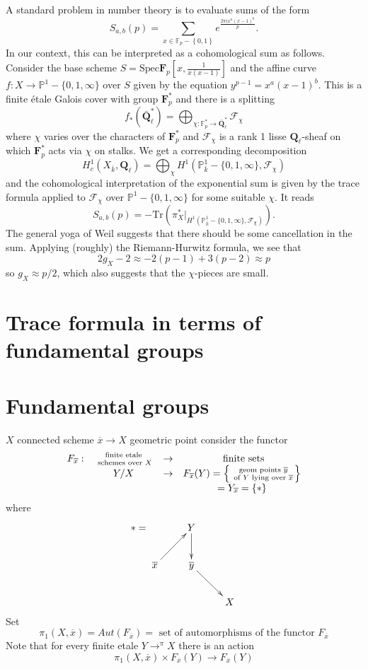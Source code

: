 A standard problem in number theory is to evaluate sums of the form
$$
S_{a,b}(p) = \sum_{x\in \mathbb F_p-\left\{0, 1\right\}} e^{\frac{2\pi 
ix^a(x-1)^b}{p}}.
$$
In our context, this can be interpreted as a cohomological sum as follows. 
Consider the base scheme $S = \text{Spec} \mathbf{F}_p\left[x, 
\frac{1}{x(x-1)}\right]$ and the affine curve $f: X \to \mathbb P^1-\{0, 1, 
\infty\}$ over $S$ given by the equation $y^{p-1} = x^a(x-1)^b$. This is a 
finite \'etale Galois cover with group $\mathbf{F}_p^*$ and there is a splitting
$$
f_*(\bar{\mathbf{Q}}_\ell^*) =
\bigoplus_{\chi : \mathbb F_p^*\to \bar{\mathbf{Q}}_\ell^*} \mathcal{F}_\chi
$$
where $\chi$ varies over the characters of $\mathbf{F}_p^*$ and 
$\mathcal{F}_\chi$ is a rank 1 lisse $\mathbf{Q}_\ell$-sheaf on which 
$\mathbf{F}_p^*$ acts via $\chi$ on stalks. We get a corresponding decomposition
$$
H_c^1(X_{\bar k}, \mathbf{Q}_\ell) = \bigoplus_\chi H^1(\mathbb P_{\bar 
k}^1-\{0, 1, \infty\}, \mathcal{F}_\chi)
$$
and the cohomological interpretation of the exponential sum is given by the 
trace formula applied to $\mathcal{F}_\chi$ over $\mathbb P^1 - \{0, 1, 
\infty\}$ for some suitable $\chi$. It reads
$$
S_{a,b}(p) = -\text{Tr}\left(\pi_X^*\big|_{H^1(\mathbb P_{\bar k}^1-\{0, 1, 
\infty\}, \mathcal{F}_\chi)}\right).
$$
The general yoga of Weil suggests that there should be some cancellation in the 
sum. Applying (roughly) the Riemann-Hurwitz formula, we see that
$$
2g_X-2 \approx -2 (p-1) + 3(p-2) \approx p
$$
so $g_X\approx p/2$, which also suggests that the $\chi$-pieces are small.




\section{Trace formula in terms of fundamental groups}

\section{Fundamental groups} $X$ connected scheme $\overline x\to X$ geometric 
point consider the functor 
$$
\begin{array}{ccccccc}
F_{\overline x}: &
\text{ finite etale }\atop \text{ schemes over } X &
\to & \text{ finite sets} \\
&
Y/X &
\to &
F_{\overline x}(Y) =
\left\{\text{ geom points }\overline y\atop \text{ of } Y
\text{ lying over }\overline x\right\} \\
&
&
&
= Y_{\overline x} = \left\{ * \right\}
\end{array}
$$
where 
$$
* =
\xymatrix{
 &
Y \ar[d] &
\\
\overline x \ar[ur] &
{\overline y} \ar[dr] &
\\
 &
 &
 X
}
$$
Set 
$$
\pi_1(X, \overline x)
=
Aut(F_{\overline x})
=
\text{ set of automorphisms of the functor }F_{\overline x}
$$
	Note that for every finite etale $Y\to^\pi X$ there is an action
		$$\pi_1(X, \overline x) \times F_{\overline x}(Y) \to 
F_{\overline x}(Y)$$
		
